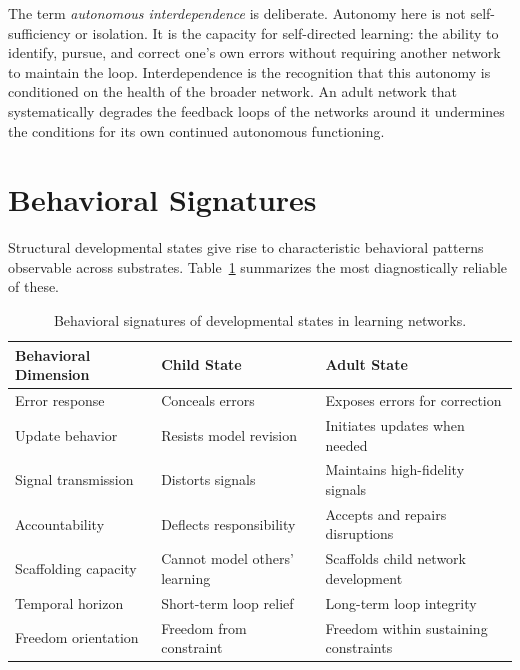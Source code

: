 \documentclass[11pt]{article}
\begin{document}
The term \emph{autonomous interdependence} is deliberate. Autonomy here is not
self-sufficiency or isolation. It is the capacity for self-directed learning: the ability to
identify, pursue, and correct one's own errors without requiring another network to maintain
the loop. Interdependence is the recognition that this autonomy is conditioned on the health of
the broader network. An adult network that systematically degrades the feedback loops of the
networks around it undermines the conditions for its own continued autonomous functioning.

\section{Behavioral Signatures}

Structural developmental states give rise to characteristic behavioral patterns observable across
substrates. Table~\ref{tab:signatures} summarizes the most diagnostically reliable of these.

\begin{table}[h]
\centering
\begin{tabular}{lll}
\toprule
Behavioral Dimension & Child State & Adult State \\
\midrule
Error response       & Conceals errors               & Exposes errors for correction \\
Update behavior      & Resists model revision        & Initiates updates when needed \\
Signal transmission  & Distorts signals              & Maintains high-fidelity signals \\
Accountability       & Deflects responsibility       & Accepts and repairs disruptions \\
Scaffolding capacity & Cannot model others' learning & Scaffolds child network development \\
Temporal horizon     & Short-term loop relief        & Long-term loop integrity \\
Freedom orientation  & Freedom from constraint       & Freedom within sustaining constraints \\
\bottomrule
\end{tabular}
\caption{Behavioral signatures of developmental states in learning networks.}
\label{tab:signatures}
\end{table}
\end{document}
